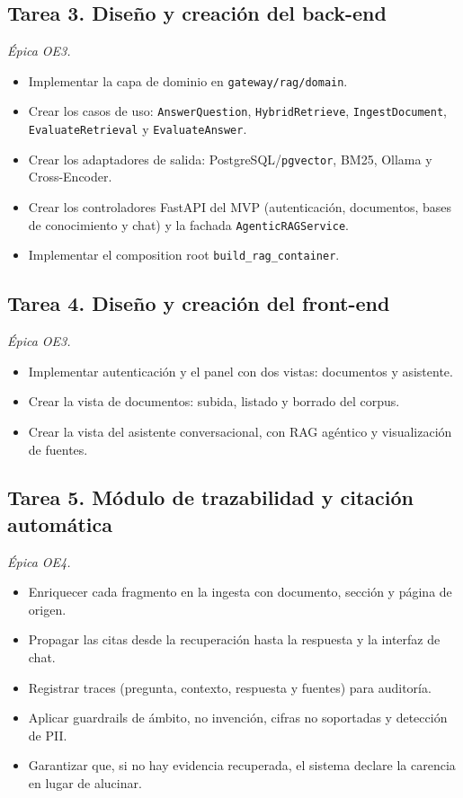 \subsection{Tarea 3. Diseño y creación del back-end}
\textit{Épica OE3.}

\begin{itemize}
  \item Implementar la capa de dominio en \texttt{gateway/rag/domain}.
  \item Crear los casos de uso: \texttt{AnswerQuestion}, \texttt{HybridRetrieve}, \texttt{IngestDocument}, \texttt{EvaluateRetrieval} y \texttt{EvaluateAnswer}.
  \item Crear los adaptadores de salida: PostgreSQL/\texttt{pgvector}, BM25, Ollama y Cross-Encoder.
  \item Crear los controladores FastAPI del MVP (autenticación, documentos, bases de conocimiento y chat) y la fachada \texttt{AgenticRAGService}.
  \item Implementar el composition root \texttt{build\_rag\_container}.
\end{itemize}

\subsection{Tarea 4. Diseño y creación del front-end}
\textit{Épica OE3.}

\begin{itemize}
  \item Implementar autenticación y el panel con dos vistas: documentos y asistente.
  \item Crear la vista de documentos: subida, listado y borrado del corpus.
  \item Crear la vista del asistente conversacional, con RAG agéntico y visualización de fuentes.
\end{itemize}

\subsection{Tarea 5. Módulo de trazabilidad y citación automática}
\textit{Épica OE4.}

\begin{itemize}
  \item Enriquecer cada fragmento en la ingesta con documento, sección y página de origen.
  \item Propagar las citas desde la recuperación hasta la respuesta y la interfaz de chat.
  \item Registrar traces (pregunta, contexto, respuesta y fuentes) para auditoría.
  \item Aplicar guardrails de ámbito, no invención, cifras no soportadas y detección de PII.
  \item Garantizar que, si no hay evidencia recuperada, el sistema declare la carencia en lugar de alucinar.
\end{itemize}

